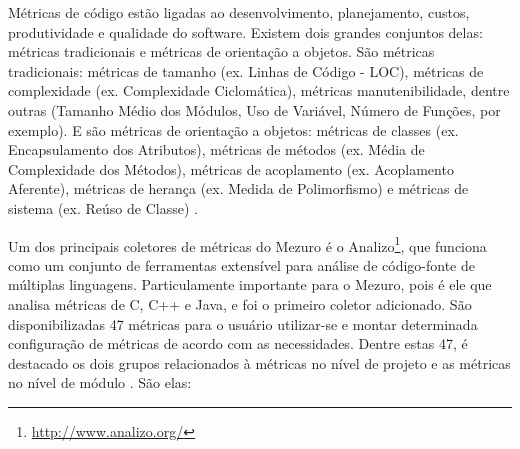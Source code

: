 Métricas de código estão ligadas ao desenvolvimento, planejamento, custos,
produtividade e qualidade do software. Existem dois grandes conjuntos delas:
métricas tradicionais e métricas de orientação a objetos. São métricas
tradicionais: métricas de tamanho (ex. Linhas de Código - LOC), métricas de
complexidade (ex. Complexidade Ciclomática), métricas manutenibilidade, dentre
outras (Tamanho Médio dos Módulos, Uso de Variável, Número de Funções, por
exemplo). E são métricas de orientação a objetos: métricas de classes (ex.
Encapsulamento dos Atributos), métricas de métodos (ex. Média de Complexidade
dos Métodos), métricas de acoplamento (ex. Acoplamento Aferente), métricas de
herança (ex. Medida de Polimorfismo) e métricas de sistema (ex. Reúso de
Classe) \cite{meirelles2013monitoramento}.


Um dos principais coletores de métricas do Mezuro é o Analizo\footnote{\url{http://www.analizo.org/}},
que funciona como um conjunto de ferramentas extensível para análise de
código-fonte de múltiplas linguagens. Particulamente importante para o Mezuro,
pois é ele que analisa métricas de C, C++ e Java, e foi o primeiro coletor
adicionado. São disponibilizadas 47 métricas para o usuário utilizar-se e montar
determinada configuração de métricas de acordo com as necessidades. Dentre estas
47, é destacado os dois grupos relacionados à métricas no nível de projeto e as
métricas no nível de módulo \cite{terceiro2010analizo}. São elas:

